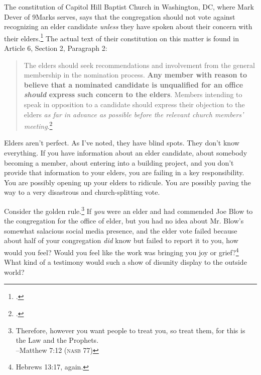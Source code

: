 The constitution of Capitol Hill Baptist Church in Washington, DC, where Mark Dever of 9Marks serves, says that the congregation should not vote against recognizing an elder candidate \textit{unless} they have spoken about their concern with their elders.\footcite[\\The full relevant quote from that page is, "In fact, our church constitution says that we can only vote against recognizing a prospective elder if we've spoken with an elder ahead of time about our concern.  \textbf{The reason for this is simple: if there's some concern you have about that individual's ability to lead this congregation that's significant enough that you would withhold your vote, it might be a good reason for the elders to withdraw that person's nomination}."]{chbc2016governance} The actual text of their constitution on this matter is found in Article 6, Section 2, Paragraph 2:
\begin{quote}
The elders should seek recommendations and involvement from the general membership in the nomination process. \textbf{Any member with reason to believe that a nominated candidate is unqualified for an office \textit{should} express such concern to the elders}. Members intending to speak in opposition to a candidate should express their objection to the elders \textit{as far in advance as possible before the relevant church members' meeting}.\footcite[\\The emphasis here is mine.]{chbc2021constitution}
\end{quote}

Elders aren't perfect.  As I've noted, they have blind spots.  They don't know everything.  If you have information about an elder candidate, about somebody becoming a member, about entering into a building project, and you don't provide that information to your elders, you are failing in a key responsibility.  You are possibly opening up your elders to ridicule.  You are possibly paving the way to a very disastrous and church-splitting vote.  

Consider the golden rule.\footnote{Therefore, however you want people to treat you, so treat them, for this is the Law and the Prophets. \\ \hspace*{\fill} --Matthew 7:12 (\textsc{nasb 77})}  If \textit{you} were an elder and had commended Joe Blow to the congregation for the office of elder, but you had no idea about Mr. Blow's somewhat salacious social media presence, and the elder vote failed because about half of your congregation \textit{did} know but failed to report it to you, how would you feel?  Would you feel like the work was bringing you joy or grief?\footnote{Hebrews 13:17, again.} What kind of a testimony would such a show of disunity display to the outside world?

